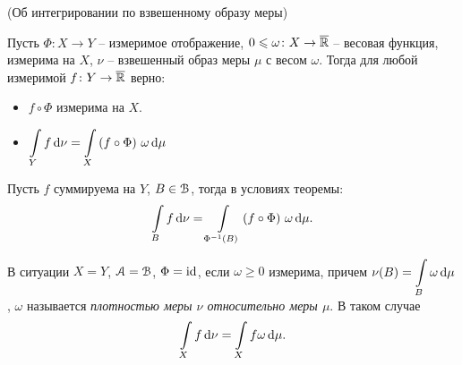\begin{theorem}(Об интегрировании по взвешенному образу меры)
    
    Пусть $\Phi \colon X \to Y$ -- измеримое отображение, $0 \leqslant 
    \omega \colon X \to \overline{\mathbb{R}}$ -- весовая функция, измерима на $X$, 
    $\nu$ -- взвешенный образ меры $\mu$ с весом $\omega$.
    Тогда для любой измеримой $f \colon Y \to \overline{\mathbb{R}}$ верно:
    \begin{itemize}
        \item $f \circ \Phi$ измерима на $X$.
        \item $\displaystyle \int\limits_{Y}{f \,\mathrm{d}\nu} = \int\limits_{X}{(f \circ \Phi)~ \omega \,\mathrm{d}\mu}$
    \end{itemize} 
\end{theorem}

\begin{corollary}
    Пусть $f$ суммируема на $Y$, $B \in \mathcal{B}$, тогда в условиях теоремы:
\[
    \int\limits_{B}{f \,\mathrm{d}\nu} = \int\limits_{\Phi^{-1}(B)}{(f \circ \Phi)~ \omega \,\mathrm{d}\mu}
.\] 
\end{corollary}

\begin{definition}
    В ситуации $X = Y$, $\mathcal{A} = \mathcal{B}$, $\Phi = \operatorname{id}$, если $\omega \geqslant 0$ измерима,
    причем $\displaystyle \nu(B) = \int\limits_{B}{\omega \,\mathrm{d}\mu}$, $\omega$ называется
    \textit{плотностью меры $\nu$ относительно меры $\mu$}.
    В таком случае
\[
    \int\limits_{X}{f \,\mathrm{d}\nu} = \int\limits_{X}{f \omega \,\mathrm{d}\mu}
.\] 
\end{definition}

